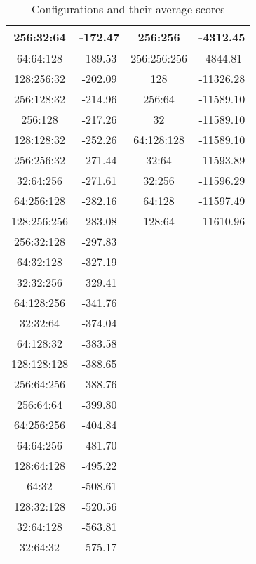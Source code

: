 \begin{table}[h]
\begin{tabular}{|c|c||c|c|}
    \hline
    256:32:64 & -172.47 & 256:256 & -4312.45 \\
    \hline
    64:64:128 & -189.53 & 256:256:256 & -4844.81 \\
    \hline
    128:256:32 & -202.09 & 128 & -11326.28 \\
    \hline
    256:128:32 & -214.96 & 256:64 & -11589.10 \\
    \hline
    256:128 & -217.26 & 32 & -11589.10 \\
    \hline
    128:128:32 & -252.26 & 64:128:128 & -11589.10 \\
    \hline
    256:256:32 & -271.44 & 32:64 & -11593.89 \\
    \hline
    32:64:256 & -271.61 & 32:256 & -11596.29 \\
    \hline
    64:256:128 & -282.16 & 64:128 & -11597.49 \\
    \hline
    128:256:256 & -283.08 & 128:64 & -11610.96 \\
    \hline
    256:32:128 & -297.83 &  &  \\
    \hline
    64:32:128 & -327.19 &  &  \\
    \hline
    32:32:256 & -329.41 &  &  \\
    \hline
    64:128:256 & -341.76 &  &  \\
    \hline
    32:32:64 & -374.04 &  &  \\
    \hline
    64:128:32 & -383.58 &  &  \\
    \hline
    128:128:128 & -388.65 &  &  \\
    \hline
    256:64:256 & -388.76 &  &  \\
    \hline
    256:64:64 & -399.80 &  &  \\
    \hline
    64:256:256 & -404.84 &  &  \\
    \hline
    64:64:256 & -481.70 &  &  \\
    \hline
    128:64:128 & -495.22 &  &  \\
    \hline
    64:32 & -508.61 &  &  \\
    \hline
    128:32:128 & -520.56 &  &  \\
    \hline
    32:64:128 & -563.81 &  &  \\
    \hline
    32:64:32 & -575.17 &  &  \\
    \hline
    \end{tabular}
    \caption{Configurations and their average scores}
    \label{tab:config_scores}
\end{table}
